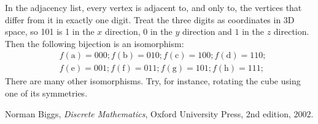\begin{questions}
\begin{solution}
    In the adjacency list, every vertex is adjacent to, and only to, the vertices that differ from it in exactly one digit.
    Treat the three digits as coordinates in 3D space, so 101 is 1 in the $x$ direction, 0 in the $y$ direction and $1$ in the $z$ direction.
    Then the following bijection is an isomorphism:
    \begin{align*}
      &f(\textrm{a}) = 000; f(\textrm{b}) = 010; f(\textrm{c}) = 100; f(\textrm{d}) = 110; \\
      &f(\textrm{e}) = 001; f(\textrm{f}) = 011; f(\textrm{g}) = 101; f(\textrm{h}) = 111;
    \end{align*}
    There are many other isomorphisms.
    Try, for instance, rotating the cube using one of its symmetries.
\end{solution}




\end{questions}

\begin{thebibliography}{9}

  Norman Biggs,
  \emph{Discrete Mathematics},
  Oxford University Press,
  2nd edition,
  2002.

\end{thebibliography}
